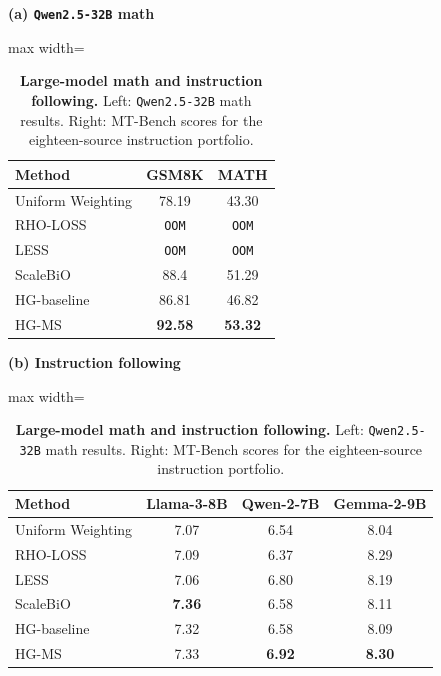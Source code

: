 \documentclass{article}
\theoremstyle{normaltheorem}
\begin{document}
\begin{table}[t]
  \centering
  \caption{\textbf{Large-model math and instruction following.}
  Left: \texttt{Qwen2.5-32B} math results. Right: MT-Bench scores for the eighteen-source instruction portfolio.}
  \label{tab:llm-realworld-math-large}
  \label{tab:llm-realworld-instr-mtbench}
  \begin{minipage}[t]{0.34\textwidth}
  \centering
  \textbf{(a) \texttt{Qwen2.5-32B} math}\\[2pt]
  \begin{adjustbox}{max width=\linewidth}
  \begin{tabular}{lcc}
    \toprule
    Method & GSM8K & MATH \\
    \midrule
    Uniform Weighting     & 78.19 & 43.30 \\
    RHO-LOSS              & \texttt{OOM} & \texttt{OOM} \\
    LESS                  & \texttt{OOM} & \texttt{OOM} \\
    ScaleBiO              & 88.4 & 51.29 \\
	HG-baseline       	  & 86.81 & 46.82\\
    HG-MS                 & \textbf{92.58} & \textbf{53.32} \\
    \bottomrule
  \end{tabular}
  \end{adjustbox}
  \end{minipage}
  \hfill
  \begin{minipage}[t]{0.55\textwidth}
  \centering
  \textbf{(b) Instruction following}\\[2pt]
  \begin{adjustbox}{max width=\linewidth}
  \begin{tabular}{lccc}
    \toprule
    Method & Llama-3-8B & Qwen-2-7B & Gemma-2-9B \\
    \midrule
    Uniform Weighting & 7.07 & 6.54 & 8.04 \\
    RHO-LOSS          & 7.09 & 6.37 & 8.29 \\
    LESS              & 7.06 & 6.80 & 8.19 \\
    ScaleBiO          & \textbf{7.36} & 6.58 & 8.11 \\
    HG-baseline       & 7.32 & 6.58 & 8.09 \\
    HG-MS             & 7.33 & \textbf{6.92} & \textbf{8.30} \\
    \bottomrule
  \end{tabular}
  \end{adjustbox}
  \end{minipage}
\end{table}
\end{document}
